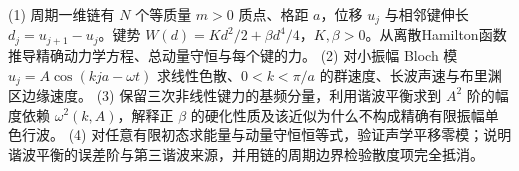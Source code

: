 (1) 周期一维链有 \(N\) 个等质量 \(m>0\) 质点、格距 \(a\)，位移 \(u_j\) 与相邻键伸长 \(d_j=u_{j+1}-u_j\)。键势 \(W(d)=Kd^2/2+\beta d^4/4\)，\(K,\beta>0\)。从离散Hamilton函数推导精确动力学方程、总动量守恒与每个键的力。
(2) 对小振幅 Bloch 模 \(u_j=A\cos(kja-\omega t)\) 求线性色散、\(0<k<\pi/a\) 的群速度、长波声速与布里渊区边缘速度。
(3) 保留三次非线性键力的基频分量，利用谐波平衡求到 \(A^2\) 阶的幅度依赖 \(\omega^2(k,A)\)，解释正 \(\beta\) 的硬化性质及该近似为什么不构成精确有限振幅单色行波。
(4) 对任意有限初态求能量与动量守恒恒等式，验证声学平移零模；说明谐波平衡的误差阶与第三谐波来源，并用链的周期边界检验散度项完全抵消。
